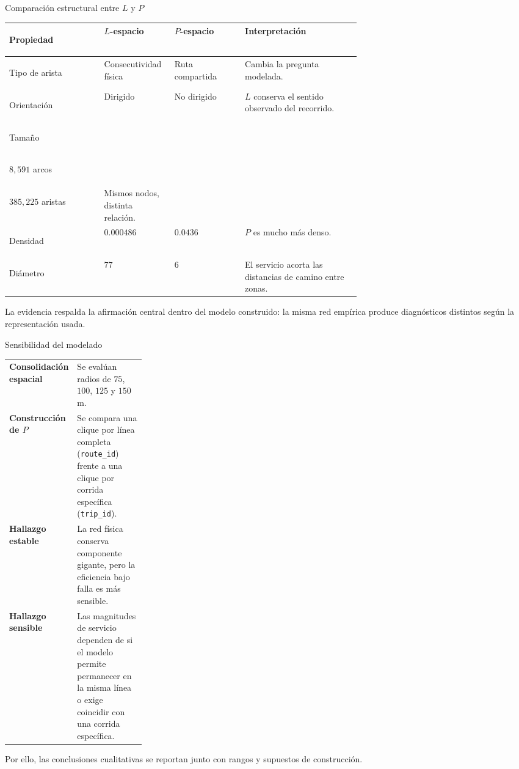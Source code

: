 \documentclass[aspectratio=169,10pt]{beamer}
\newcommand{\thinrule}{\par\vspace{0.2cm}\noindent{\color{linegray}\rule{0.88\linewidth}{0.45pt}}\par\vspace{0.2cm}}
\begin{document}
\begin{frame}{Comparación estructural entre \(L\) y \(P\)}
  \scriptsize
  \begin{tabularx}{\linewidth}{@{}>{\bfseries\raggedright\arraybackslash}p{0.27\linewidth}>{\raggedright\arraybackslash}p{0.20\linewidth}>{\raggedright\arraybackslash}p{0.20\linewidth}X@{}}
    \toprule
    Propiedad & \(L\)-espacio & \(P\)-espacio & Interpretación \\
    \midrule
    Tipo de arista & Consecutividad física & Ruta compartida & Cambia la pregunta modelada. \\
    Orientación & Dirigido & No dirigido & \(L\) conserva el sentido observado del recorrido. \\
    Tamaño & \begin{tabular}[t]{@{}l@{}}\(4{,}203\) nodos;\\ \(8{,}591\) arcos\end{tabular} & \begin{tabular}[t]{@{}l@{}}\(4{,}203\) nodos;\\ \(385{,}225\) aristas\end{tabular} & Mismos nodos, distinta relación. \\
    Densidad & \(0.000486\) & \(0.0436\) & \(P\) es mucho más denso. \\
    Diámetro & \(77\) & \(6\) & El servicio acorta las distancias de camino entre zonas. \\
    \bottomrule
  \end{tabularx}

  \normalsize
  \thinrule
  {\raggedright
  La evidencia respalda la afirmación central dentro del modelo construido: la misma red empírica produce diagnósticos distintos según la representación usada.\par}
\end{frame}

\begin{frame}{Sensibilidad del modelado}
  \begin{tabularx}{\linewidth}{@{}>{\bfseries}p{0.26\linewidth}X@{}}
    Consolidación espacial & Se evalúan radios de \(75\), \(100\), \(125\) y \(150\) m. \\
    Construcción de \(P\) & Se compara una clique por línea completa (\texttt{route\_id}) frente a una clique por corrida específica (\texttt{trip\_id}). \\
    Hallazgo estable & La red física conserva componente gigante, pero la eficiencia bajo falla es más sensible. \\
    Hallazgo sensible & Las magnitudes de servicio dependen de si el modelo permite permanecer en la misma línea o exige coincidir con una corrida específica. \\
  \end{tabularx}

  \thinrule
  Por ello, las conclusiones cualitativas se reportan junto con rangos y supuestos de construcción.
\end{frame}
\end{document}
